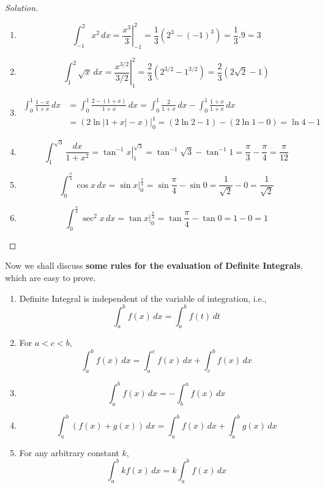 \documentclass{book}
\theoremstyle{definition}
\newenvironment{solution}
    {\begin{proof}[Solution]}
    {\end{proof}}
\begin{document}
\begin{solution}
\begin{enumerate}[label=(\roman*)]
\item 
\[
\int _{-1}^2 x^2\,dx=\left.\frac{x^3}{3}\right\vert _{-1}^2 =\frac{1}{3}(2^3-(-1)^3)=\frac{1}{3}.9=3
\]


\item 
\[
\int _1^2 \sqrt{x}\, dx=\left.\frac{x^{3/2}}{3/2}\right\vert_1^2=\frac{2}{3}(2^{3/2}-1^{3/2})=\frac{2}{3}(2\sqrt{2}-1)
\]

\item 
\begin{align*}
\int _0^1 \frac{1-x}{1+x} \, dx &= \int _0^1 \frac{2-(1+x)}{1+x} \, dx = \int _0^1 \frac{2}{1+x} \, dx - \int _0^1 \frac{1+x}{1+x} \, dx \\ 
&= \left.\left(2\ln|1+x|-x\right)\right\vert_0^1=(2\ln 2-1)-(2\ln 1-0)=\ln 4-1
\end{align*}

\item
\[
\int _1^{\sqrt{3}} \frac{dx}{1+x^2}=\left.\tan^{-1}x\right\vert_1^{\sqrt{3}}=\tan^{-1}\sqrt{3}-\tan^{-1} 1=\frac{\pi}{3}-\frac{\pi}{4}=\frac{\pi}{12}
\]

\item 
\[
\int_0^{\frac{\pi}{4}}\cos x \, dx=\left.\sin x\right\vert_0^{\frac{\pi}{4}}=\sin \frac{\pi}{4}-\sin 0=\frac{1}{\sqrt{2}}-0=\frac{1}{\sqrt{2}}
\]

\item 
\[
\int _0^{\frac{\pi}{4}}\sec^2 x \, dx = \tan x\vert_0^{\frac{\pi}{4}} = \tan \frac{\pi}{4}-\tan 0 = 1-0 = 1
\]


\end{enumerate}
\end{solution}


Now we shall discuss \textbf{some rules for the evaluation of Definite Integrals}, which are easy to prove.

\begin{enumerate}[label=(\roman*)]
\item Definite Integral is independent of the variable of integration, i.e., 
\[
\int_a^b f(x)\,dx=\displaystyle\int_a^b f(t)\,dt
\]

\item For $a<c<b$,
\[
\int_a^b f(x)\,dx =\int_a^c f(x)\,dx +\int_c^b f(x)\,dx
\]

\item \[
\int_a^b f(x)\,dx=-\int_b^a f(x)\,dx
\]

\item \[
\int_a^b (f(x)+g(x))\,dx= \int_a^b f(x)\,dx+\int_a^b g(x)\,dx
\]

\item For any arbitrary constant $k$, 
\[
\int_a^b kf(x)\,dx= k\int_a^b f(x)\,dx
\]
\end{enumerate}
\end{document}
